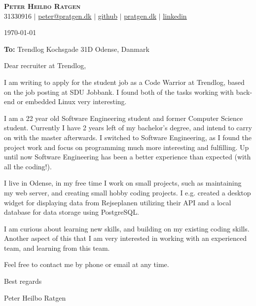 \documentclass{article}
\begin{document}
\begin{center}
  \textbf{\huge{\scshape{Peter Heilbo Ratgen}}}\\ 
  \vspace{0.2cm}
  \small 31330916 $|$
  \href{mailto:peter@pratgen.dk}{\underline{peter@pratgen.dk}} $|$
  \href{https://github.com/PeterRatgen }{\underline{github}} $|$
  \href{https://pratgen.dk}{\underline{pratgen.dk}} $|$
  \href{https://www.linkedin.com/in/peter-ratgen-a1236529/}{\underline{linkedin}}
\end{center}
\vspace{0.5cm}

\begin{flushright}
  \today
\end{flushright}
\begin{flushleft}
\textbf{To:}\newline
Trendlog\newline
Kochsgade 31D  Odense, Danmark 
\end{flushleft}
\vspace{0.5cm}

Dear recruiter at Trendlog, \vspace{\baselineskip}

I am writing to apply for the student job as a Code Warrior at Trendlog, based
on the job posting at SDU Jobbank. I found both of the tasks working with
back-end or embedded Linux very interesting. \vspace{\baselineskip}

I am a 22 year old Software Engineering student and former Computer Science
student. Currently I have 2 years left of my bachelor's degree, and intend to
carry on with the master afterwards. I switched to Software Engineering, as I
found the project work and focus on programming much more interesting and
fulfilling. Up until now Software Engineering has been a better experience than
expected (with all the coding!). \vspace{\baselineskip}

I live in Odense, in my free time I work on small projects, such as maintaining
my web server, and creating small hobby coding projects. I e.g. created a desktop
widget for displaying data from Rejseplanen utilizing their API and a local
database for data storage using PostgreSQL.\vspace{\baselineskip}

I am curious about learning new skills, and building on my existing coding
skills. Another aspect of this that I am very interested in working with an
experienced team, and learning from this team.

Feel free to contact me by phone or email at any time. \vspace{\baselineskip}

\begin{flushleft}
Best regards 

\vspace{\baselineskip} Peter Heilbo Ratgen
\end{flushleft}
\end{document}
